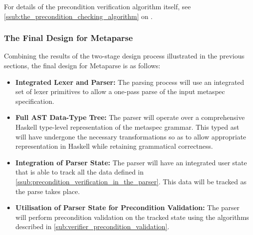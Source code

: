 For details of the precondition verification algorithm itself, see \autoref{ssub:the_precondition_checking_algorithm} on .


\subsubsection{The Final Design for Metaparse} %
\label{ssub:the_final_design_for_metaparse}
Combining the results of the two-stage design process illustrated in the previous sections, the final design for Metaparse is as follows:
\begin{itemize}
    \item \textbf{Integrated Lexer and Parser:} The parsing process will use an integrated set of lexer primitives to allow a one-pass parse of the input \gls{metaspec} specification. 
    \item \textbf{Full AST Data-Type Tree:} The parser will operate over a comprehensive Haskell type-level representation of the \gls{metaspec} grammar. 
    This typed \gls{ast} will have undergone the necessary transformations so as to allow appropriate representation in Haskell while retaining grammatical correctness. 
    \item \textbf{Integration of Parser State:} The parser will have an integrated user state that is able to track all the data defined in \autoref{ssub:precondition_verification_in_the_parser}.
    This data will be tracked as the parse takes place. 
    \item \textbf{Utilisation of Parser State for Precondition Validation:}
    The parser will perform precondition validation on the tracked state using the algorithms described in \autoref{sub:verifier_precondition_validation}.
\end{itemize}



